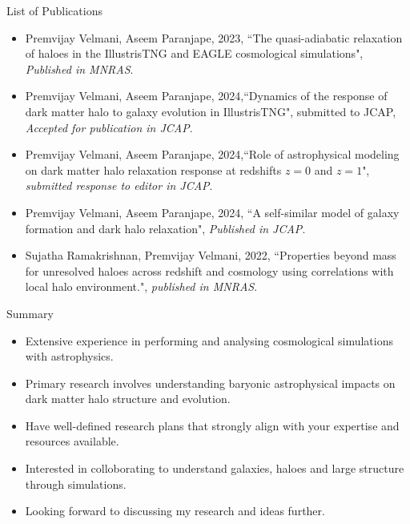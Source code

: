 \documentclass{beamer}
\begin{document}
\begin{frame}{List of Publications}
\begin{itemize}
    \item Premvijay Velmani, Aseem Paranjape, 2023, ``The quasi-adiabatic relaxation of haloes in the IllustrisTNG and EAGLE cosmological simulations", \textit{Published in MNRAS}.
    \item Premvijay Velmani, Aseem Paranjape, 2024,``Dynamics of the response of dark matter halo to galaxy evolution in IllustrisTNG", submitted to JCAP, \textit{Accepted for publication in JCAP}.
    \item Premvijay Velmani, Aseem Paranjape, 2024,``Role of astrophysical modeling on dark matter halo relaxation response at redshifts $z = 0$ and $z = 1$", \textit{submitted response to editor in JCAP}.
    \item Premvijay Velmani, Aseem Paranjape, 2024, ``A self-similar model of galaxy formation and dark halo relaxation", \textit{Published in JCAP}.
    \item Sujatha Ramakrishnan, Premvijay Velmani, 2022, ``Properties beyond mass for unresolved haloes across redshift and cosmology using correlations with local halo environment.", \textit{published in MNRAS}.
\end{itemize}
\end{frame}

\begin{frame}{Summary}
    \begin{itemize}
        \item Extensive experience in performing and analysing cosmological simulations with astrophysics.
        \item Primary research involves understanding baryonic astrophysical impacts on dark matter halo structure and evolution.
        \item Have well-defined research plans that strongly align with your expertise and resources available.
        \item Interested in colloborating to understand galaxies, haloes and large structure through simulations.
        \item Looking forward to discussing my research and ideas further.
    \end{itemize}
\end{frame}




        

\end{document}
